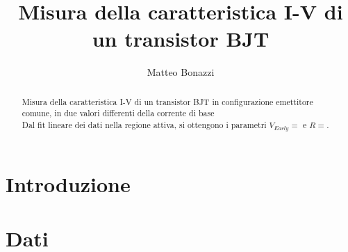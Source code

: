 \documentclass{article}
\title{Misura della caratteristica I-V di un transistor BJT}
\author{Matteo Bonazzi}
\begin{document}
\maketitle
\begin{abstract}
Misura della caratteristica I-V di un transistor BJT in configurazione emettitore comune, in due valori differenti della corrente di base \\
Dal fit lineare dei dati nella regione attiva, si ottengono i parametri $V_{Early}=$ e $R=$.
\end{abstract}

\section{Introduzione}

\section{Dati}
\end{document}
